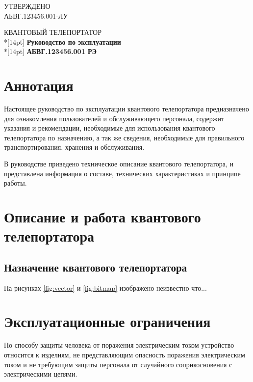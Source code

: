 \documentclass[14pt]{extreport}
\begin{document}
\begin{sloppypar}

\enlargegosttitle
\gosttitle
{\strut}
{
УТВЕРЖДЕНО\\
АБВГ.123456.001-ЛУ
}
{\strut}
{
\uppercase{Квантовый телепортатор}\\*[14pt]
\textbf{Руководство по эксплуатации}\\*[14pt]
\textbf{АБВГ.123456.001 РЭ}
}
{\strut}
{\strut}
{\strut}

\setcounter{page}{2}
\section*{Аннотация}

Настоящее руководство по эксплуатации квантового телепортатора предназначено для ознакомления пользователей и обслуживающего персонала, содержит указания и рекомендации, необходимые для использования квантового телепортатора по назначению, а так же сведения, необходимые для правильного транспортирования, хранения и обслуживания.

В руководстве приведено техническое описание квантового телепортатора, и представлена информация о составе, технических характеристиках и принципе работы.

\renewcommand\contentsname{\vspace{-32mm}\centerline{\Large{Содержание}}}
\tableofcontents
\newpage

\section{Описание и работа квантового телепортатора}
\subsection{Назначение квантового телепортатора}

На рисунках \ref{fig:vector} и \ref{fig:bitmap} изображено неизвестно что...


\clearpage
\section{Эксплуатационные ограничения}

По способу защиты человека от поражения электрическим током устройство относится к изделиям, не представляющим опасность поражения электрическим током и не требующим защиты персонала от случайного соприкосновения с электрическими цепями.

\end{sloppypar}
\end{document}
